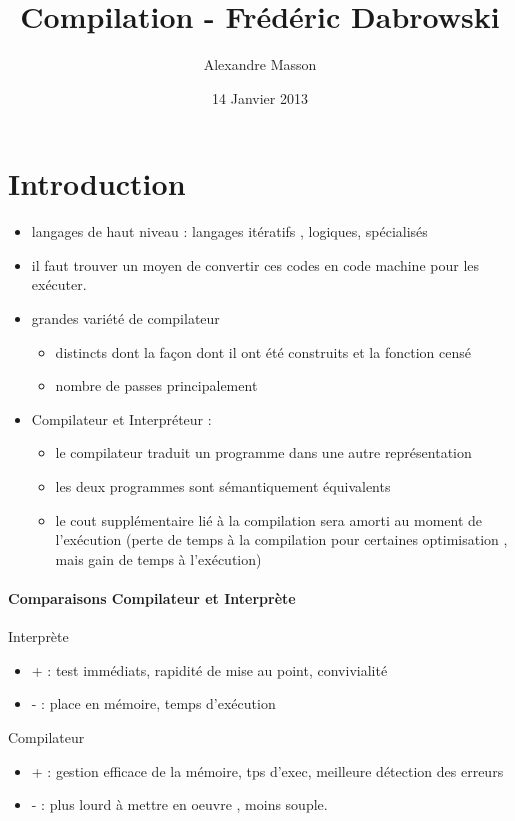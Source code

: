 \documentclass{article}
\title{Compilation - Frédéric Dabrowski}
\author{Alexandre Masson}
\date{14 Janvier 2013}
\begin{document}
\maketitle
\newpage
\section{Introduction}
\begin{itemize}
\item langages de haut niveau : langages itératifs , logiques, spécialisés
\item il faut trouver un moyen de convertir ces codes en code machine pour les exécuter.
\item grandes variété de compilateur
\begin{itemize}
\item distincts dont la façon dont il ont été construits et la fonction censé 
\item nombre de passes principalement
\end{itemize}
\item Compilateur et Interpréteur : 
\begin{itemize}
\item le compilateur traduit un programme dans une autre représentation
\item les deux programmes sont sémantiquement équivalents
\item le cout supplémentaire lié à la compilation sera amorti au moment de l'exécution (perte de temps à la compilation pour certaines optimisation , mais gain de temps à l'exécution)
\end{itemize}
\end{itemize}

\paragraph{Comparaisons Compilateur et Interprète}
Interprète
\begin{itemize}
\item  + : test immédiats, rapidité de mise au point, convivialité
\item - : place en mémoire, temps d'exécution
\end{itemize}
Compilateur
\begin{itemize}
\item + : gestion efficace de la mémoire, tps d'exec, meilleure détection des erreurs
\item - : plus lourd à mettre en oeuvre , moins souple.
\end{itemize}
\end{document}
